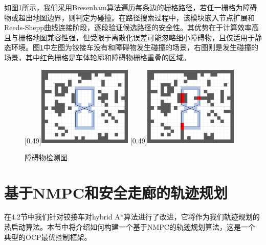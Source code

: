 \documentclass[master,academic]{ysuthesis} %
\begin{document}
		如图\ref{fig:障碍物检测图}所示，我们采用Bresenham算法遍历每条边的栅格路径，若任一栅格为障碍物或超出地图边界，则判定为碰撞。在路径搜索过程中，该模块嵌入节点扩展和Reeds-Shepp曲线连接阶段，逐段验证候选路径的安全性。其优势在于计算效率高且与栅格地图兼容性强，但受限于离散化误差可能忽略细小障碍物，且仅适用于静态环境。图\ref{fig:障碍物检测图}中左图为铰接车没有和障碍物发生碰撞的场景，右图则是发生碰撞的场景，其中红色栅格是车体轮廓和障碍物栅格重叠的区域。
		\begin{figure}[!ht]
			\centering
			[0.49\textwidth]{\includegraphics[width=0.4\textwidth]{bresham_free.png}}
			[0.49\textwidth]{\includegraphics[width=0.4\textwidth]{bresham_colli.png}}
			\caption{障碍物检测图}
			\label{fig:障碍物检测图}
		\end{figure}
	\section{基于NMPC和安全走廊的轨迹规划}
	在4.2节中我们针对铰接车对hybrid A*算法进行了改进，它将作为我们轨迹规划的热启动算法。本节中将介绍如何构建一个基于NMPC的轨迹规划算法，这是一个典型的OCP最优控制框架。
\end{document}
